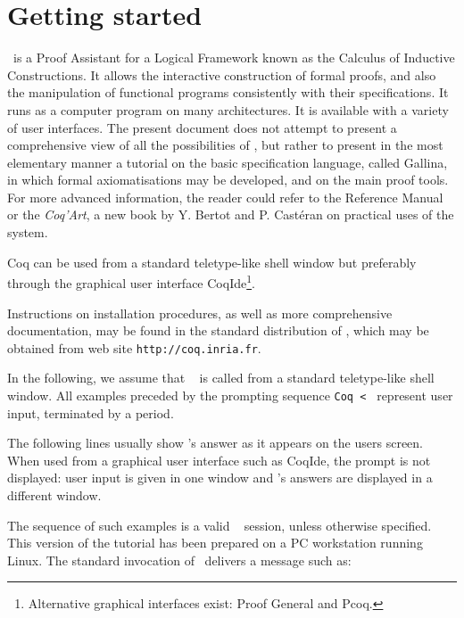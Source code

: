 \documentclass[11pt,a4paper]{book}
\begin{document}


\chapter*{Getting started}

\Coq\ is a Proof Assistant for a Logical Framework known as the Calculus
of Inductive Constructions. It allows the interactive construction of
formal proofs, and also the manipulation of functional programs 
consistently with their specifications. It runs as a computer program
on many architectures.
It is available with a variety of user interfaces. The present
document does not attempt to present a comprehensive view of all the
possibilities of \Coq, but rather to present in the most elementary
manner a tutorial on the basic specification language, called Gallina,
in which formal axiomatisations may be developed, and on the main
proof tools.  For more advanced information, the reader could refer to
the \Coq{} Reference Manual or the \textit{Coq'Art}, a new book by Y.
Bertot and P. Castéran on practical uses of the \Coq{} system.

Coq can be used from a standard teletype-like shell window but
preferably through the graphical user interface
CoqIde\footnote{Alternative graphical interfaces exist: Proof General
and Pcoq.}.

Instructions on installation procedures, as well as more comprehensive
documentation, may be found in the standard distribution of \Coq,
which may be obtained from \Coq{} web site \texttt{http://coq.inria.fr}.

In the following, we assume that \Coq~ is called from a standard
teletype-like shell window. All examples preceded by the prompting
sequence \verb:Coq < : represent user input, terminated by a
period. 

The following lines usually show \Coq's answer as it appears on the
users screen. When used from a graphical user interface such as
CoqIde, the prompt is not displayed: user input is given in one window
and \Coq's answers are displayed in a different window.

The sequence of such examples is a valid \Coq~
session, unless otherwise specified. This version of the tutorial has
been prepared on a PC workstation running Linux.  The standard
invocation of \Coq\ delivers a message such as:
\end{document}
